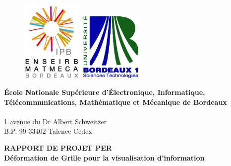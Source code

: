 \begin{titlepage}
  \begin {figure}[ht]
	\includegraphics[angle=0,width=3cm]{img/logo.jpg}
        \hspace{10cm}
	\includegraphics[angle=0,width=3cm]{img/logobordeaux1.jpg}
	\label{logo}
  \end {figure}
  \begin{flushleft}
    \textbf{École Nationale Supérieure d’Électronique, Informatique, Télécommunications, Mathématique et Mécanique de Bordeaux} \\~\\
    
    1 avenue du Dr Albert Schweitzer \\
    B.P. 99 33402 Talence Cedex\\
  \end{flushleft}
  
  \vspace{2cm}
	\begin{center}
	  {\bf RAPPORT DE PROJET PER}\\
	  \vspace{1cm}
		 {\LARGE\bf Déformation de Grille pour la visualisation d'information}
	\end{center}

\newpage


\end{titlepage}
